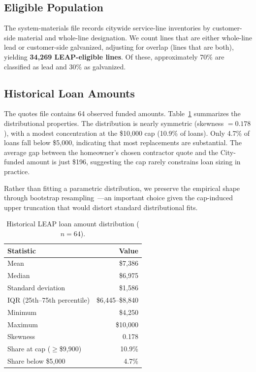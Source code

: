 \documentclass[11pt, letterpaper]{article}
\begin{document}
\subsection{Eligible Population}

The system-materials file records citywide service-line inventories by customer-side material and whole-line designation. We count lines that are either whole-line lead or customer-side galvanized, adjusting for overlap (lines that are both), yielding \textbf{34{,}269 LEAP-eligible lines}. Of these, approximately 70\% are classified as lead and 30\% as galvanized.

\subsection{Historical Loan Amounts}

The quotes file contains 64 observed funded amounts. Table~\ref{tab:loan_dist} summarizes the distributional properties. The distribution is nearly symmetric (skewness $= 0.178$), with a modest concentration at the \$10{,}000 cap (10.9\% of loans). Only 4.7\% of loans fall below \$5{,}000, indicating that most replacements are substantial. The average gap between the homeowner's chosen contractor quote and the City-funded amount is just \$196, suggesting the cap rarely constrains loan sizing in practice.

Rather than fitting a parametric distribution, we preserve the empirical shape through bootstrap resampling~\cite{efron1993}---an important choice given the cap-induced upper truncation that would distort standard distributional fits.

\begin{table}[H]
  \centering
  \caption{Historical LEAP loan amount distribution ($n = 64$).}
  \label{tab:loan_dist}
  \begin{tabular}{@{}lr@{}}
    \toprule
    \textbf{Statistic} & \textbf{Value} \\
    \midrule
    Mean & \$7{,}386 \\
    Median & \$6{,}975 \\
    Standard deviation & \$1{,}586 \\
    IQR (25th--75th percentile) & \$6{,}445--\$8{,}840 \\
    Minimum & \$4{,}250 \\
    Maximum & \$10{,}000 \\
    Skewness & 0.178 \\
    Share at cap ($\geq$\$9{,}900) & 10.9\% \\
    Share below \$5{,}000 & 4.7\% \\
    \bottomrule
  \end{tabular}
\end{table}
\end{document}
